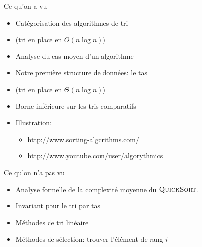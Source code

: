 \begin{frame}{Ce qu'on a vu}

\begin{itemize}
\item Catégorisation des algorithmes de tri
\item {} (tri en place en $O(n\log n))$
\item Analyse du cas moyen d'un algorithme
\item Notre première structure de données: le tas
\item {} (tri en place en $\Theta(n\log n)$)
\item Borne inférieure sur les tris comparatifs

\bigskip

\item Illustration:
\begin{itemize}
\item \url{http://www.sorting-algorithms.com/}
\item \url{http://www.youtube.com/user/algorythmics}
\end{itemize}

\end{itemize}

\end{frame}

\begin{frame}{Ce qu'on n'a pas vu}

\begin{itemize}
\item Analyse formelle de la complexité moyenne du $\textnormal{\scshape QuickSort}$.
\item Invariant pour le tri par tas
\item Méthodes de tri linéaire
\item Méthodes de sélection: trouver l'élément de rang $i$
\end{itemize}

\end{frame}
